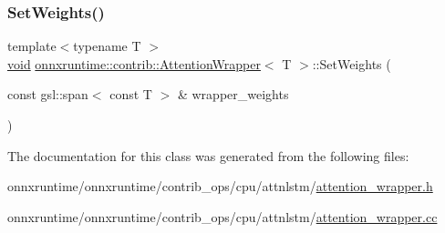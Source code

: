 \mbox{\label{classonnxruntime_1_1contrib_1_1AttentionWrapper_ad8a0553c691ac852a17c9f3e993a8ab5}} 
\subsubsection{\texorpdfstring{Set\+Weights()}{SetWeights()}}
{\footnotesize\ttfamily template$<$typename T $>$ \\
\mbox{\hyperlink{mlasi_8h_a88f941d423cb2a819b70a1358982b1a6}{void}} \mbox{\hyperlink{classonnxruntime_1_1contrib_1_1AttentionWrapper}{onnxruntime\+::contrib\+::\+Attention\+Wrapper}}$<$ T $>$\+::Set\+Weights (\begin{DoxyParamCaption}\item[{const gsl\+::span$<$ const T $>$ \&}]{wrapper\+\_\+weights }\end{DoxyParamCaption})}



The documentation for this class was generated from the following files\+:\begin{DoxyCompactItemize}
\item 
onnxruntime/onnxruntime/contrib\+\_\+ops/cpu/attnlstm/\mbox{\hyperlink{attention__wrapper_8h}{attention\+\_\+wrapper.\+h}}\item 
onnxruntime/onnxruntime/contrib\+\_\+ops/cpu/attnlstm/\mbox{\hyperlink{attention__wrapper_8cc}{attention\+\_\+wrapper.\+cc}}\end{DoxyCompactItemize}
